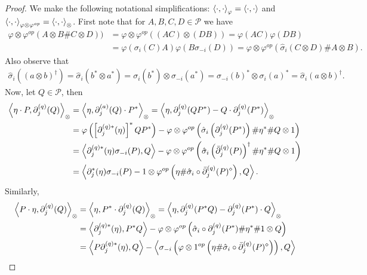 \begin{proof}
We make the following notational simplifications: $\left\langle\cdot,\cdot\right\rangle_{\varphi}=\left\langle\cdot,\cdot\right\rangle$ and $\left\langle\cdot,\cdot\right\rangle_{\varphi\otimes\varphi^{op}} = \left\langle\cdot,\cdot\right\rangle_\otimes$. First note that for $A,B,C,D\in \mathscr{P}$ we have
	\begin{align*}
		\varphi\otimes\varphi^{op}( A\otimes B\# C\otimes D))&=\varphi\otimes \varphi^{op
}( (AC)\otimes (DB))= \varphi(AC)\varphi(DB)\\
			&=\varphi(\sigma_i(C)A)\varphi(B\sigma_{-i}(D)) =\varphi\otimes \varphi^{op} (\hat{\sigma}_i(C\otimes D)\# A\otimes B).
	\end{align*}
Also observe that
	\begin{align*}
		\hat{\sigma}_i\left( (a\otimes b)^\dagger\right)= \hat{\sigma}_i (b^*\otimes a^*)= \sigma_i(b^*)\otimes \sigma_{-i}(a^*)= \sigma_{-i}(b)^* \otimes \sigma_i(a)^* = \hat{\sigma}_i(a\otimes b)^\dagger.
	\end{align*}
Now, let $Q\in\mathscr{P}$, then
	\begin{align*}
		\left\langle\eta\cdot P, \partial_j^{(q)}(Q)\right\rangle_\otimes&=\left\langle\eta, \partial_j^{(a)}(Q)\cdot P^*\right\rangle_\otimes=\left\langle\eta, \partial_j^{(q)}(QP^*) - Q\cdot\partial_j^{(q)}(P^*)\right\rangle_\otimes\\
			&=\varphi\left(\left[\partial_j^{(q)*}(\eta)\right]^* QP^*\right) - \varphi\otimes\varphi^{op}\left(\hat{\sigma}_i\left(\partial_j^{(q)}(P^*)\right)\# \eta^*\# Q\otimes 1\right)\\
			&=\left\langle\partial_j^{(q)*}(\eta)\sigma_{-i}(P),Q\right\rangle -\varphi\otimes\varphi^{op} \left( \hat{\sigma}_i\left(\bar{\partial}_j^{(q)}(P)\right)^\dagger \#\eta^*\#Q\otimes 1\right)\\
			&=\left\langle\partial_j^*(\eta)\sigma_{-i}(P) -1\otimes\varphi^{op} \left(\eta\#\hat{\sigma}_i\circ\bar{\partial}_j^{(q)}(P)^\diamond\right), Q\right\rangle.
	\end{align*}
Similarly,
	\begin{align*}
		\<P\cdot\eta,\partial_j^{(q)}(Q)\>_\otimes&= \<\eta, P^*\cdot\partial_j^{(q)}(Q)\>_\otimes = \<\eta, \partial_j^{(q)}(P^*Q) - \partial_j^{(q)}(P^*)\cdot Q\>_\otimes\\ 
			&=\<\partial_j^{(q)*}(\eta), P^*Q\> - \varphi\otimes \varphi^{op}\left( \hat{\sigma}_i\circ \partial_j^{(q)}(P^*)\#\eta^*\# 1\otimes Q\right)\\
			&=\<P\partial_j^{(q)*}(\eta), Q\> - \<\sigma_{-i}\left(\varphi\otimes 1^{op}\left( \eta\#\hat{\sigma}_i\circ \bar{\partial}_j^{(q)}(P)^\diamond\right)\right), Q\>\\

\end{align*}
\end{proof}
